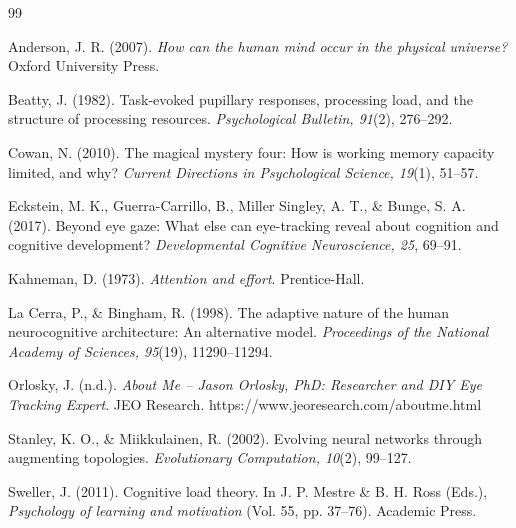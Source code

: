 \documentclass[12pt,a4paper,oneside]{book}
\begin{document}
\newpage
{}
\renewcommand{\bibname}{\centering IRODALOMJEGYZÉK}

\begingroup
\singlespacing      %
\setlength{\parskip}{2pt} %

\begin{thebibliography}{99}

Anderson, J. R. (2007). \textit{How can the human mind occur in the physical universe?} Oxford University Press.

Beatty, J. (1982). Task-evoked pupillary responses, processing load, and the structure of processing resources. \textit{Psychological Bulletin, 91}(2), 276--292.

Cowan, N. (2010). The magical mystery four: How is working memory capacity limited, and why? \textit{Current Directions in Psychological Science, 19}(1), 51--57.

Eckstein, M. K., Guerra-Carrillo, B., Miller Singley, A. T., \& Bunge, S. A. (2017). Beyond eye gaze: What else can eye-tracking reveal about cognition and cognitive development? \textit{Developmental Cognitive Neuroscience, 25}, 69--91.

Kahneman, D. (1973). \textit{Attention and effort}. Prentice-Hall.

La Cerra, P., \& Bingham, R. (1998). The adaptive nature of the human neurocognitive architecture: An alternative model. \textit{Proceedings of the National Academy of Sciences, 95}(19), 11290--11294.

Orlosky, J. (n.d.). \textit{About Me -- Jason Orlosky, PhD: Researcher and DIY Eye Tracking Expert}. JEO Research. https://www.jeoresearch.com/aboutme.html

Stanley, K. O., \& Miikkulainen, R. (2002). Evolving neural networks through augmenting topologies. \textit{Evolutionary Computation, 10}(2), 99--127.

Sweller, J. (2011). Cognitive load theory. In J. P. Mestre \& B. H. Ross (Eds.), \textit{Psychology of learning and motivation} (Vol. 55, pp. 37--76). Academic Press.


\end{thebibliography}
\end{document}
